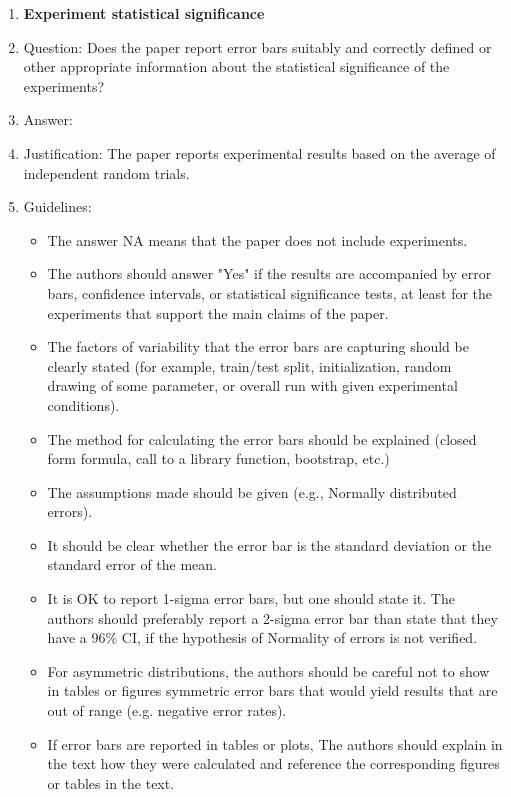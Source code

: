 \documentclass{article}
\numberwithin{equation}{section}
\theoremstyle{definition}
\begin{document}
\begin{enumerate}
\item {\bf Experiment statistical significance}
    \item[] Question: Does the paper report error bars suitably and correctly defined or other appropriate information about the statistical significance of the experiments?
    \item[] Answer: \answerYes{} %
    \item[] Justification: The paper reports experimental results based on the average of independent random trials.
    \item[] Guidelines:
    \begin{itemize}
        \item The answer NA means that the paper does not include experiments.
        \item The authors should answer "Yes" if the results are accompanied by error bars, confidence intervals, or statistical significance tests, at least for the experiments that support the main claims of the paper.
        \item The factors of variability that the error bars are capturing should be clearly stated (for example, train/test split, initialization, random drawing of some parameter, or overall run with given experimental conditions).
        \item The method for calculating the error bars should be explained (closed form formula, call to a library function, bootstrap, etc.)
        \item The assumptions made should be given (e.g., Normally distributed errors).
        \item It should be clear whether the error bar is the standard deviation or the standard error of the mean.
        \item It is OK to report 1-sigma error bars, but one should state it. The authors should preferably report a 2-sigma error bar than state that they have a 96\% CI, if the hypothesis of Normality of errors is not verified.
        \item For asymmetric distributions, the authors should be careful not to show in tables or figures symmetric error bars that would yield results that are out of range (e.g. negative error rates).
        \item If error bars are reported in tables or plots, The authors should explain in the text how they were calculated and reference the corresponding figures or tables in the text.
    \end{itemize}


\end{enumerate}
\end{document}
